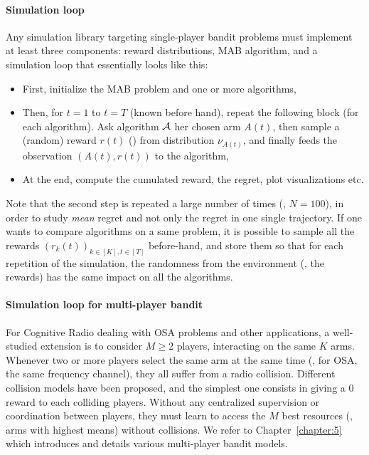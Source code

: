 \paragraph{Simulation loop}
%
Any simulation library targeting single-player bandit problems must implement at least three components:
reward distributions, MAB algorithm, and a simulation loop that essentially looks like this:
\begin{itemize}
    \item First, initialize the MAB problem and one or more algorithms,
    \item Then, for $t=1$ to $t=T$ (known before hand), repeat the following block (for each algorithm). Ask algorithm $\mathcal{A}$ her chosen arm $A(t)$, then sample a (random) reward $r(t)$ (\iid) from distribution $\nu_{A(t)}$, and finally feeds the observation $(A(t), r(t))$ to the algorithm,
    \item At the end, compute the cumulated reward, the regret, plot visualizations etc.
\end{itemize}
%
Note that the second step is repeated a large number of times (\eg, $N=100$), in order to study \emph{mean} regret and not only the regret in one single trajectory.
If one wants to compare algorithms on a same problem, it is possible to sample all the rewards $(r_k(t))_{k\in[K], t\in[T]}$ before-hand, and store them so that for each repetition of the simulation, the randomness from the environment (\ie, the rewards) has the same impact on all the algorithms.


\paragraph{Simulation loop for multi-player bandit}

For Cognitive Radio dealing with OSA problems and other applications, a well-studied extension is to consider $M\geq2$ players, interacting on the same $K$ arms.
Whenever two or more players select the same arm at the same time (\eg, for OSA, the same frequency channel), they all suffer from a radio collision.
%
Different collision models have been proposed, and the simplest one consists in giving a $0$ reward to each colliding players.
Without any centralized supervision or coordination between players, they must learn to access the $M$ best resources (\ie, arms with highest means) without collisions.
We refer to Chapter~\ref{chapter:5} which introduces and details various multi-player bandit models.

